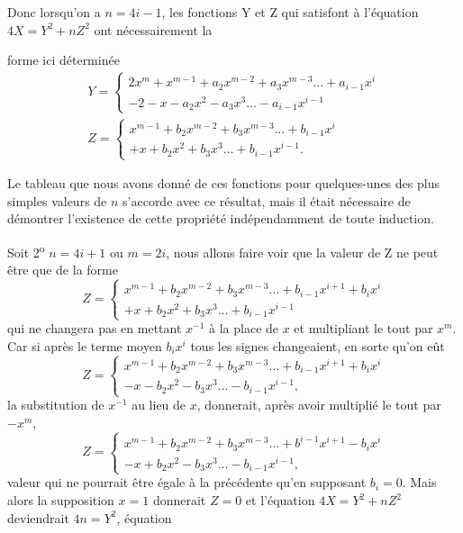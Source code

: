 \documentclass[11pt,a4paper]{article}
\begin{document}
Donc lorsqu'on a $n = 4i - 1$, les fonctions Y et Z qui satisfont à
l'équation $4X = Y^2 + nZ^2$ ont nécessairement la


forme ici déterminée
\[
\begin{array}{l}
Y = \left\{ \begin{array}{l}
2x^m + x^{m-1} + a_2 x^{m-2} + a_3 x^{m-3} \ldots + a_{i-1} x^i \\
- 2 - x - a_2 x^2 - a_3 x^3 \ldots - a_{i-1} x^{i-1}
\end{array} \right. \\[1ex]
Z = \left\{ \begin{array}{l}
x^{m-1} + b_2 x^{m-2} + b_3 x^{m-3} \ldots + b_{i-1} x^i \\
+ x + b_2 x^2 + b_3 x^3 \ldots + b_{i-1} x^{i-1}.
\end{array} \right.
\end{array}
\]

Le tableau que nous avons donné de ces fonctions pour quelques-unes des
plus simples valeurs de $n$ s'accorde avec ce résultat, mais il était
nécessaire de démontrer l'existence de cette propriété indépendamment de
toute induction.

Soit 2\textsuperscript{o} $n = 4i + 1$ ou $m = 2i$, nous allons faire voir
que la valeur de Z ne peut être que de la forme
\[
Z = \left\{ \begin{array}{l}
x^{m-1} + b_2 x^{m-2} + b_3 x^{m-3} \ldots + b_{i-1} x^{i+1} + b_i x^i \\
+ x + b_2 x^2 + b_3 x^3 \ldots + b_{i-1} x^{i-1}
\end{array} \right.
\]
qui ne changera pas en mettant $x^{-1}$ à la place de $x$ et multipliant
le tout par $x^m$. Car si après le terme moyen $b_i x^i$ tous les signes
changeaient, en sorte qu'on eût
\[
Z = \left\{ \begin{array}{l}
x^{m-1} + b_2 x^{m-2} + b_3 x^{m-3} \ldots + b_{i-1} x^{i+1} + b_i x^i \\
- x - b_2 x^2 - b_3 x^3 \ldots - b_{i-1} x^{i-1},
\end{array} \right.
\]
la substitution de $x^{-1}$ au lieu de $x$, donnerait, après avoir
multiplié le tout par $-x^m$,
\[
Z = \left\{ \begin{array}{l}
x^{m-1} + b_2 x^{m-2} + b_3 x^{m-3} \ldots + b^{i-1} x^{i+1} - b_i x^i \\
- x + b_2 x^2 - b_3 x^3 \ldots - b_{i-1} x^{i-1},
\end{array} \right.
\]
valeur qui ne pourrait être égale à la précédente qu'en supposant
$b_i = 0$. Mais alors la supposition $x = 1$ donnerait $Z = 0$ et
l'équation $4X = Y^2 + nZ^2$ deviendrait $4n = Y^2$, équation
\end{document}
